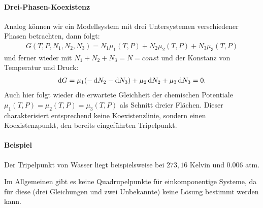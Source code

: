 \paragraph*{Drei-Phasen-Koexistenz}
Analog können wir ein Modellsystem mit drei Untersystemen verschiedener Phasen betrachten, dann folgt:
\begin{align*}
    G(T,P,N_1,N_2,N_3)=N_1\mu_1(T,P)+N_2\mu_2(T,P)+N_3\mu_3(T,P)
\end{align*}
und ferner wieder mit $N_1+N_2+N_3=N=const$ und der Konstanz von Temperatur und Druck:
\begin{align*}
    \mathop{}\!\mathrm{d} G=\mu_1(-\mathop{}\!\mathrm{d} N_2-\mathop{}\!\mathrm{d} N_3)+\mu_2\mathop{}\!\mathrm{d} N_2+\mu_3\mathop{}\!\mathrm{d} N_3=0.
\end{align*}
Auch hier folgt wieder die erwartete Gleichheit der chemischen Potentiale ${\mu_1(T,P)=\mu_2(T,P)=\mu_3(T,P)}$ als Schnitt dreier Flächen. Dieser charakterisiert entsprechend keine Koexistenzlinie, sondern einen Koexistenzpunkt, den bereits eingeführten Tripelpunkt. 
\paragraph*{Beispiel}
Der Tripelpunkt von Wasser liegt beispielsweise bei $273,16$ Kelvin und $0.006$ atm.

Im Allgemeinen gibt es keine Quadrupelpunkte für einkomponentige Systeme, da für diese (drei Gleichungen und zwei Unbekannte) keine Lösung bestimmt werden kann. 

